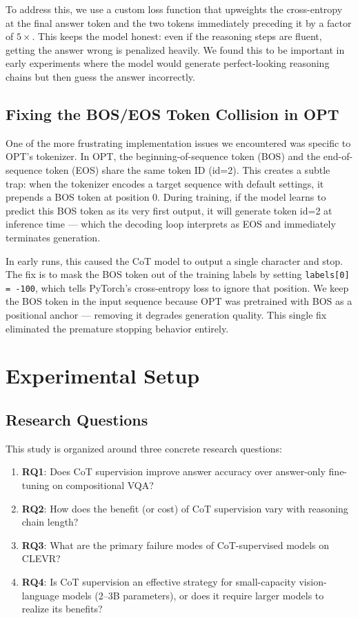 \documentclass[11pt,twocolumn]{article}
\begin{document}
To address this, we use a custom loss function that upweights the cross-entropy at the final answer token and the two tokens immediately preceding it by a factor of $5\times$. This keeps the model honest: even if the reasoning steps are fluent, getting the answer wrong is penalized heavily. We found this to be important in early experiments where the model would generate perfect-looking reasoning chains but then guess the answer incorrectly.

\subsection{Fixing the BOS/EOS Token Collision in OPT}

One of the more frustrating implementation issues we encountered was specific to OPT's tokenizer. In OPT, the beginning-of-sequence token (BOS) and the end-of-sequence token (EOS) share the same token ID (id=2). This creates a subtle trap: when the tokenizer encodes a target sequence with default settings, it prepends a BOS token at position 0. During training, if the model learns to predict this BOS token as its very first output, it will generate token id=2 at inference time — which the decoding loop interprets as EOS and immediately terminates generation.

In early runs, this caused the CoT model to output a single character and stop. The fix is to mask the BOS token out of the training labels by setting \texttt{labels[0] = -100}, which tells PyTorch's cross-entropy loss to ignore that position. We keep the BOS token in the input sequence because OPT was pretrained with BOS as a positional anchor — removing it degrades generation quality. This single fix eliminated the premature stopping behavior entirely.

\section{Experimental Setup}

\subsection{Research Questions}

This study is organized around three concrete research questions:

\begin{enumerate}
    \item \textbf{RQ1}: Does CoT supervision improve answer accuracy over answer-only fine-tuning on compositional VQA?
    \item \textbf{RQ2}: How does the benefit (or cost) of CoT supervision vary with reasoning chain length?
    \item \textbf{RQ3}: What are the primary failure modes of CoT-supervised models on CLEVR?
    \item \textbf{RQ4}: Is CoT supervision an effective strategy for small-capacity vision-language models (2--3B parameters), or does it require larger models to realize its benefits?
\end{enumerate}
\end{document}
